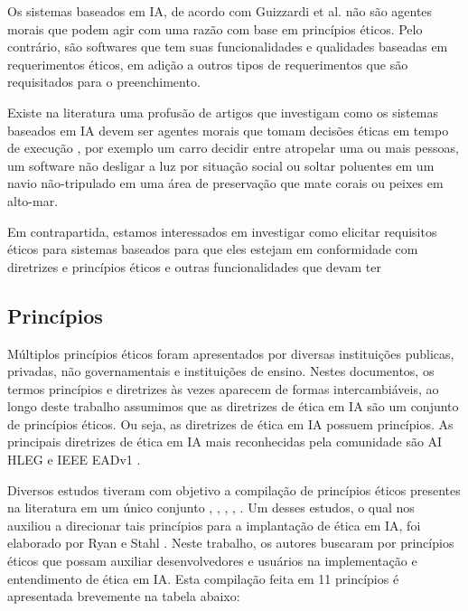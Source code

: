 
Os sistemas baseados em \acrshort{IA}, de acordo com Guizzardi et al. \cite{guizzardi2020ethical} não são agentes morais que podem agir com uma razão com base em princípios éticos. Pelo contrário, são softwares que tem suas funcionalidades e qualidades baseadas em requerimentos éticos, em adição a outros tipos de requerimentos que são requisitados para o preenchimento.

Existe na literatura uma profusão de artigos que investigam como os sistemas baseados em IA devem ser agentes morais que tomam decisões éticas em tempo de execução \cite{guizzardi2020ethical}, por exemplo um carro decidir entre atropelar uma ou mais pessoas, um software não desligar a luz por situação social ou soltar poluentes em um navio não-tripulado em uma área de preservação que mate corais ou peixes em alto-mar.
 
Em contrapartida, estamos interessados em investigar como elicitar requisitos éticos para sistemas baseados para que eles estejam em conformidade com diretrizes e princípios éticos e outras funcionalidades que devam ter \cite{guizzardi2020ethical}
 
\subsection{Princípios}

Múltiplos princípios éticos foram apresentados por diversas instituições publicas, privadas, não governamentais e instituições de ensino. Nestes documentos, os termos princípios e diretrizes às vezes aparecem de formas intercambiáveis, ao longo deste trabalho assumimos que as diretrizes de ética em IA são um conjunto de princípios éticos. Ou seja, as diretrizes de ética em IA possuem princípios. As principais diretrizes de ética em IA mais reconhecidas pela comunidade são \acrshort{AI HLEG}\cite{HLEG_EthicsGuidelinesForTrustworthyAI} e \acrshort{IEEE} \acrshort{EAD}v1 \cite{ieee2020EADv1}.

Diversos estudos tiveram com objetivo a compilação de princípios éticos presentes na literatura em um único conjunto \cite{hagendorff2020ethics}, \cite{jobin2019global}, \cite{Fjeld2020principled}, \cite{Zeng2019LinkingAI}, \cite{koensmit2020areviewofaiprinciples}. Um desses estudos, o qual nos auxiliou a direcionar tais princípios para a implantação de ética em \acrshort{IA}, foi elaborado por Ryan e Stahl \cite{Ryan2020ArtificialIE}. Neste trabalho, os autores buscaram por princípios éticos que possam auxiliar desenvolvedores e usuários na implementação e entendimento de ética em IA. Esta compilação feita em 11 princípios é apresentada brevemente na tabela abaixo:


